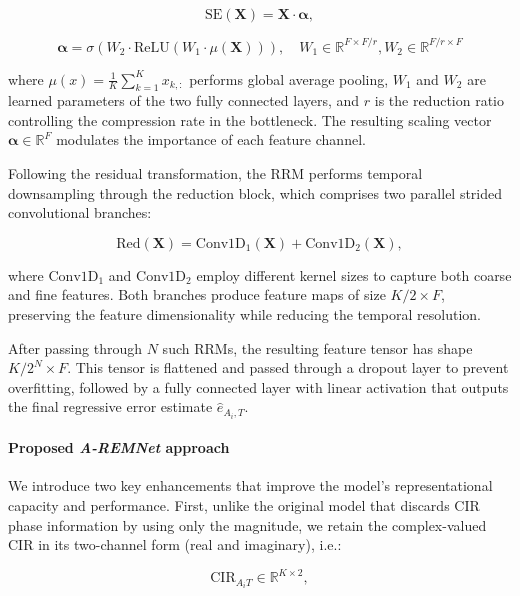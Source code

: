 \begin{equation}
    \text{SE}(\mathbf{X}) = \mathbf{X} \cdot \boldsymbol{\alpha},
\end{equation}

\begin{equation}
    \boldsymbol{\alpha} = \sigma\left(W_2 \cdot \text{ReLU}(W_1 \cdot \mu(\mathbf{X}))\right),\quad W_1 \in \mathbb{R}^{F \times F/r}, W_2 \in \mathbb{R}^{F/r \times F}
\end{equation}

where $\mu(x) = \frac{1}{K} \sum_{k=1}^{K} x_{k,:}$ performs global average pooling, $W_1$ and $W_2$ are learned parameters of the two fully connected layers, and $r$ is the reduction ratio controlling the compression rate in the bottleneck. The resulting scaling vector $\boldsymbol{\alpha} \in \mathbb{R}^F$ modulates the importance of each feature channel.

Following the residual transformation, the RRM performs temporal downsampling through the reduction block, which comprises two parallel strided convolutional branches:

\begin{equation}
    \text{Red}(\mathbf{X}) = \text{Conv1D}_1(\mathbf{X}) + \text{Conv1D}_2(\mathbf{X}),
\end{equation}

where $\text{Conv1D}_1$ and $\text{Conv1D}_2$ employ different kernel sizes to capture both coarse and fine features. Both branches produce feature maps of size $K/2 \times F$, preserving the feature dimensionality while reducing the temporal resolution.

After passing through $N$ such RRMs, the resulting feature tensor has shape $K / 2^N \times F$. This tensor is flattened and passed through a dropout layer to prevent overfitting, followed by a fully connected layer with linear activation that outputs the final regressive error estimate $\hat{e}_{A_i,T}$.

\paragraph{Proposed \emph{A-REMNet} approach}
We introduce two key enhancements that improve the model's representational capacity and performance. First, unlike the original model that discards CIR phase information by using only the magnitude, we retain the complex-valued CIR in its two-channel form (real and imaginary), i.e.: 

\begin{equation}
    \text{CIR}_{A_iT} \in \mathbb{R}^{K \times 2},
\end{equation}

